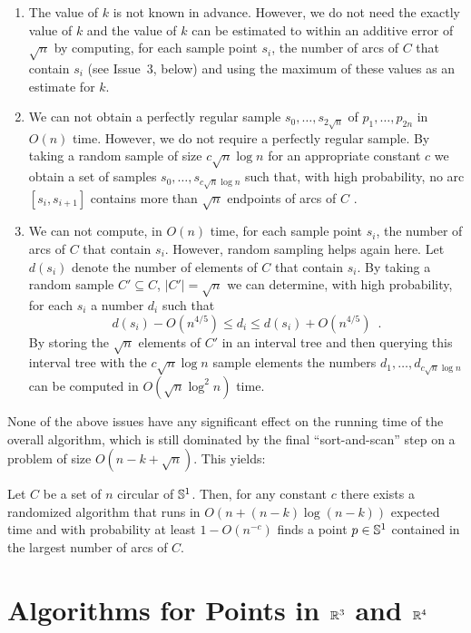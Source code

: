 \documentclass[charterfonts,lotsofwhite]{patmorin}
\begin{document}
\begin{enumerate}

\item The value of $k$ is not known in advance.  However, we do not
need the exactly value of $k$ and the value of $k$ can be estimated to
within an additive error of $\sqrt{n}$ by computing, for each sample
point $s_i$, the number of arcs of $C$ that contain $s_i$ (see
Issue~3, below) and using the maximum of these values as an estimate
for $k$.

\item We can not obtain a perfectly regular sample
$s_0,\ldots,s_{2\sqrt{n}}$ of $p_1,\ldots,p_{2n}$ in $O(n)$ time.
However, we do not require a perfectly regular sample.  By taking a
random sample of size $c\sqrt{n}\log n$ for an appropriate constant
$c$ we obtain a set of samples $s_0,\ldots,s_{c\sqrt{n}\log n}$ such
that, with high probability, no arc $[s_{i},s_{i+1}]$ contains more
than $\sqrt{n}$ endpoints of arcs of $C$ \cite{m98}.

\item We can not compute, in $O(n)$ time, for each sample point $s_i$,
the number of arcs of $C$ that contain $s_i$.  However, random
sampling helps again here.  Let $d(s_i)$ denote the number of elements
of $C$ that contain $s_i$. By taking a random sample $C'\subseteq C$,
$|C'|=\sqrt{n}$ we can determine, with high probability, for each $s_i$ a
number $d_i$ such that
\[
        d(s_i) - O(n^{4/5})\le d_i \le
           d(s_i) + O(n^{4/5}) \enspace .
\]
By storing the $\sqrt{n}$ elements of $C'$ in an interval tree \cite{ps85} and
then querying this interval tree with the $c\sqrt{n}\log n$ sample
elements the numbers $d_1,\ldots,d_{c\sqrt{n}\log n}$ can be computed
in $O(\sqrt{n}\log^2 n)$
time.  
\end{enumerate}

None of the above issues have any significant effect on the running
time of the overall algorithm, which is still dominated by the final
``sort-and-scan'' step on a problem of size $O(n-k+\sqrt{n})$.  This
yields:

\begin{thm}
Let
$C$ be a set of $n$ circular of $\mathbb{S}^1$.  Then, for any constant
$c$ there exists a randomized algorithm that runs in $O(n+(n-k)\log
(n-k))$ expected time and with probability at least $1-O(n^{-c})$
finds a point $p\in\mathbb{S}^1$ contained in the largest number of arcs of
$C$.
\end{thm}


\section{Algorithms for Points in $\mathbb{R}^3$ and $\mathbb{R}^4$}
\end{document}
